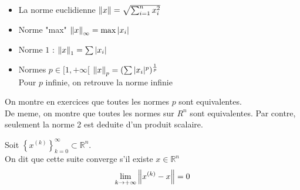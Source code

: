 \documentclass[../main.tex]{subfiles}
\begin{document}
\begin{itemize}
	\item La norme euclidienne $\left\lVert x\right\rVert = \sqrt{ \sum_{i=1}^{ n}x_i^{2}} $
\item Norme "max" $\left\lVert x\right\rVert _{ \infty }= \max |x_i| $
\item Norme $1$ :  $\left\lVert x\right\rVert_1 = \sum |x_i|$ 
\item Normes $p \in [ 1, + \infty [  $ $ \left\lVert x\right\rVert _p = ( \sum |x_i|^{p} )^{\frac{1}{p}}$ \\
	Pour $p$ infinie, on retrouve la norme infinie
\end{itemize}
On montre en exercices que toutes les normes $p$ sont equivalentes.\\
De meme, on montre que toutes les normes sur $R^{n}$ sont equivalentes.
Par contre, seulement la norme 2 est deduite d'un produit scalaire.\\
\begin{defn}
	Soit $ \left\{ x^{( k) } \right\}_{k=0}^{ \infty } \subset \mathbb{R}^{n}$.\\
	On dit que cette suite converge s'il existe $x \in \mathbb{R}^{n}$ 
	\[ 
		\lim_{k \to  + \infty} \left\lVert x^{( k) }-x\right\rVert =0
	\]
	

	
\end{defn}
\end{document}
